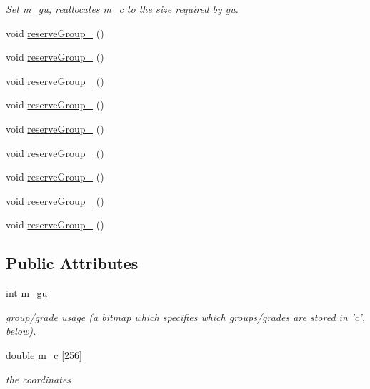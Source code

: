 \begin{DoxyCompactItemize}
\begin{DoxyCompactList}\small\item\em Set m\-\_\-gu, reallocates m\-\_\-c to the size required by gu. \end{DoxyCompactList}\item 
void \hyperlink{classe3ga_1_1mv_a99e5a40a8d8e476ce0e26c17daa5eb98}{reserve\-Group\-\_} ()
\item 
void \hyperlink{classe3ga_1_1mv_a7474f9f8a37099a7a252d59a5f2c88f7}{reserve\-Group\-\_} ()
\item 
void \hyperlink{classe3ga_1_1mv_aaa7e7cb5e1f484a264494e221b73c1cd}{reserve\-Group\-\_} ()
\item 
void \hyperlink{classe3ga_1_1mv_ac1f1dd6eb00f9e1b17ce406e87f97c9d}{reserve\-Group\-\_} ()
\item 
void \hyperlink{classe3ga_1_1mv_a2631c8e1ff6a48b5fa88f46ddaa5de41}{reserve\-Group\-\_} ()
\item 
void \hyperlink{classe3ga_1_1mv_a3fb3a8be8a9e223754af77486ae7c595}{reserve\-Group\-\_} ()
\item 
void \hyperlink{classe3ga_1_1mv_a4404a8655ad271bed3fc65bcffdc4ca6}{reserve\-Group\-\_} ()
\item 
void \hyperlink{classe3ga_1_1mv_a2c019d6ec0d4d4ece33bec59328f43ef}{reserve\-Group\-\_} ()
\item 
void \hyperlink{classe3ga_1_1mv_ad67c229006dfcc324125d138a30da848}{reserve\-Group\-\_} ()
\end{DoxyCompactItemize}
\subsection*{Public Attributes}
\begin{DoxyCompactItemize}
\item 
\hypertarget{classe3ga_1_1mv_a82a7caae1fdd543ddfd240bc72043885}{int \hyperlink{classe3ga_1_1mv_a82a7caae1fdd543ddfd240bc72043885}{m\-\_\-gu}}\label{classe3ga_1_1mv_a82a7caae1fdd543ddfd240bc72043885}

\begin{DoxyCompactList}\small\item\em group/grade usage (a bitmap which specifies which groups/grades are stored in 'c', below). \end{DoxyCompactList}\item 
\hypertarget{classe3ga_1_1mv_ac27d5ab8dd29f66a1296045fd0db5513}{double \hyperlink{classe3ga_1_1mv_ac27d5ab8dd29f66a1296045fd0db5513}{m\-\_\-c} \mbox{[}256\mbox{]}}\label{classe3ga_1_1mv_ac27d5ab8dd29f66a1296045fd0db5513}

\begin{DoxyCompactList}\small\item\em the coordinates \end{DoxyCompactList}\end{DoxyCompactItemize}


